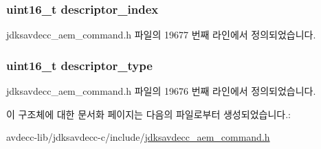 \subsubsection[{\texorpdfstring{descriptor\+\_\+index}{descriptor_index}}]{\setlength{\rightskip}{0pt plus 5cm}uint16\+\_\+t descriptor\+\_\+index}\hypertarget{structjdksavdecc__aem__command__get__signal__selector_a042bbc76d835b82d27c1932431ee38d4}{}\label{structjdksavdecc__aem__command__get__signal__selector_a042bbc76d835b82d27c1932431ee38d4}


jdksavdecc\+\_\+aem\+\_\+command.\+h 파일의 19677 번째 라인에서 정의되었습니다.

\subsubsection[{\texorpdfstring{descriptor\+\_\+type}{descriptor_type}}]{\setlength{\rightskip}{0pt plus 5cm}uint16\+\_\+t descriptor\+\_\+type}\hypertarget{structjdksavdecc__aem__command__get__signal__selector_ab7c32b6c7131c13d4ea3b7ee2f09b78d}{}\label{structjdksavdecc__aem__command__get__signal__selector_ab7c32b6c7131c13d4ea3b7ee2f09b78d}


jdksavdecc\+\_\+aem\+\_\+command.\+h 파일의 19676 번째 라인에서 정의되었습니다.



이 구조체에 대한 문서화 페이지는 다음의 파일로부터 생성되었습니다.\+:\begin{DoxyCompactItemize}
\item 
avdecc-\/lib/jdksavdecc-\/c/include/\hyperlink{jdksavdecc__aem__command_8h}{jdksavdecc\+\_\+aem\+\_\+command.\+h}\end{DoxyCompactItemize}
